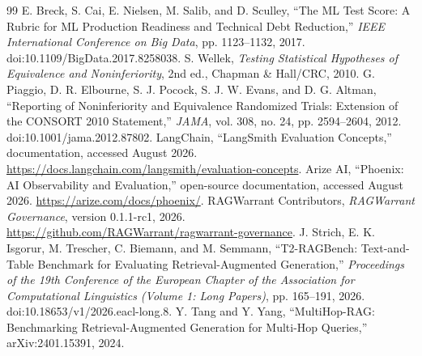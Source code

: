 \documentclass[11pt]{article}
\begin{document}
\begin{thebibliography}{99}
 E. Breck, S. Cai, E. Nielsen, M. Salib, and D. Sculley, ``The ML Test Score: A Rubric for ML Production Readiness and Technical Debt Reduction,'' \emph{IEEE International Conference on Big Data}, pp. 1123--1132, 2017. doi:10.1109/BigData.2017.8258038.
 S. Wellek, \emph{Testing Statistical Hypotheses of Equivalence and Noninferiority}, 2nd ed., Chapman \& Hall/CRC, 2010.
 G. Piaggio, D. R. Elbourne, S. J. Pocock, S. J. W. Evans, and D. G. Altman, ``Reporting of Noninferiority and Equivalence Randomized Trials: Extension of the CONSORT 2010 Statement,'' \emph{JAMA}, vol. 308, no. 24, pp. 2594--2604, 2012. doi:10.1001/jama.2012.87802.
 LangChain, ``LangSmith Evaluation Concepts,'' documentation, accessed August 2026. \url{https://docs.langchain.com/langsmith/evaluation-concepts}.
 Arize AI, ``Phoenix: AI Observability and Evaluation,'' open-source documentation, accessed August 2026. \url{https://arize.com/docs/phoenix/}.
 RAGWarrant Contributors, \emph{RAGWarrant Governance}, version 0.1.1-rc1, 2026. \url{https://github.com/RAGWarrant/ragwarrant-governance}.
 J. Strich, E. K. Isgorur, M. Trescher, C. Biemann, and M. Semmann, ``T2-RAGBench: Text-and-Table Benchmark for Evaluating Retrieval-Augmented Generation,'' \emph{Proceedings of the 19th Conference of the European Chapter of the Association for Computational Linguistics (Volume 1: Long Papers)}, pp. 165--191, 2026. doi:10.18653/v1/2026.eacl-long.8.
 Y. Tang and Y. Yang, ``MultiHop-RAG: Benchmarking Retrieval-Augmented Generation for Multi-Hop Queries,'' arXiv:2401.15391, 2024.
\end{thebibliography}
\end{document}
